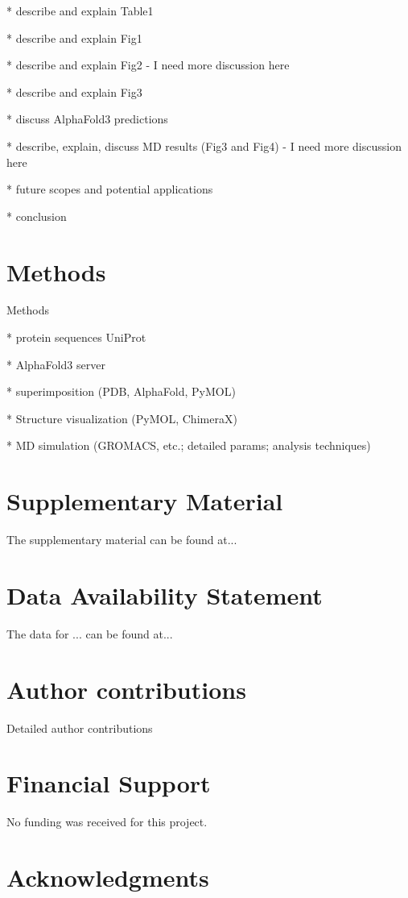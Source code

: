\documentclass[fleqn,10pt,lineno]{manuscript}
\begin{document}
* describe and explain Table1

* describe and explain Fig1

* describe and explain Fig2
	- I need more discussion here

* describe and explain Fig3

* discuss AlphaFold3 predictions

* describe, explain, discuss MD results (Fig3 and Fig4)
	- I need more discussion here

* future scopes and potential applications

* conclusion

\section*{Methods}

Methods

* protein sequences UniProt

* AlphaFold3 server

* superimposition (PDB, AlphaFold, PyMOL)

* Structure visualization (PyMOL, ChimeraX)

* MD simulation (GROMACS, etc.; detailed params; analysis techniques)


\section*{Supplementary Material}

The supplementary material can be found at...


\section*{Data Availability Statement} 

The data for ... can be found at...


\section*{Author contributions}

Detailed author contributions


\section*{Financial Support}

No funding was received for this project. 


\section*{Acknowledgments}
\end{document}
